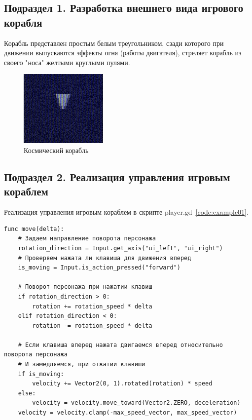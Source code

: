 \subsection{\label{subsec:ch02/sec01/sub01}Подраздел 1. Разработка внешнего вида игрового корабля}

Корабль представлен простым белым треугольником, сзади которого при движении выпускаются эффекты огня (работы двигателя), стреляет корабль из своего "носа" желтыми круглыми пулями.

\begin{figure}
    \centering
    \includegraphics[width=0.5\linewidth]{images/spaceship.png}
    \caption{Космический корабль}
    \label{fig:enter-label}
\end{figure}

\subsection{\label{subsec:ch02/sec01/sub02}Подраздел 2. Реализация управления игровым кораблем}


Реализация управления игровым кораблем в скрипте player.gd~\ref{code:example01}.
\begin{code}
\vspace{-\baselineskip}\begin{verbatim}
func move(delta):
    # Задаем направление поворота персонажа
    rotation_direction = Input.get_axis("ui_left", "ui_right")
    # Проверяем нажата ли клавиша для движения вперед
    is_moving = Input.is_action_pressed("forward")

    # Поворот персонажа при нажатии клавиш
    if rotation_direction > 0:
        rotation += rotation_speed * delta
    elif rotation_direction < 0:
        rotation -= rotation_speed * delta

    # Если клавиша вперед нажата двигаемся вперед относительно поворота персонажа
    # И замедляемся, при отжатии клавиши
    if is_moving:
        velocity += Vector2(0, 1).rotated(rotation) * speed
    else:
        velocity = velocity.move_toward(Vector2.ZERO, deceleration)
    velocity = velocity.clamp(-max_speed_vector, max_speed_vector)
\end{verbatim}
\end{code}

